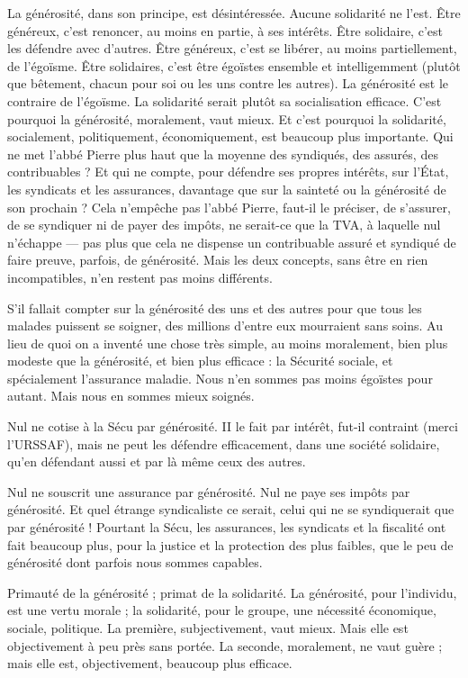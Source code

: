 La générosité, dans son principe, est désintéressée. Aucune solidarité ne
l'est. Être généreux, c’est renoncer, au moins en partie, à ses intérêts. Être solidaire,
c’est les défendre avec d’autres. Être généreux, c’est se libérer, au moins
partiellement, de l’égoïsme. Être solidaires, c’est être égoïstes ensemble et intelligemment
(plutôt que bêtement, chacun pour soi ou les uns contre les autres).
La générosité est le contraire de l’égoïsme. La solidarité serait plutôt sa socialisation
efficace. C’est pourquoi la générosité, moralement, vaut mieux. Et c’est
pourquoi la solidarité, socialement, politiquement, économiquement, est beaucoup
plus importante. Qui ne met l'abbé Pierre plus haut que la moyenne des
syndiqués, des assurés, des contribuables ? Et qui ne compte, pour défendre ses
propres intérêts, sur l’État, les syndicats et les assurances, davantage que sur la
sainteté ou la générosité de son prochain ? Cela n’empêche pas l’abbé Pierre,
faut-il le préciser, de s’assurer, de se syndiquer ni de payer des impôts, ne serait-ce
que la TVA, à laquelle nul n'échappe — pas plus que cela ne dispense un
contribuable assuré et syndiqué de faire preuve, parfois, de générosité. Mais
les deux concepts, sans être en rien incompatibles, n’en restent pas moins différents.

S’il fallait compter sur la générosité des uns et des autres pour que tous les
malades puissent se soigner, des millions d’entre eux mourraient sans soins. Au
lieu de quoi on a inventé une chose très simple, au moins moralement, bien
plus modeste que la générosité, et bien plus efficace : la Sécurité sociale, et spécialement
l'assurance maladie. Nous n’en sommes pas moins égoïstes pour
autant. Mais nous en sommes mieux soignés.

Nul ne cotise à la Sécu par générosité. II le fait par intérêt, fut-il contraint
(merci l'URSSAF), mais ne peut les défendre efficacement, dans une société
solidaire, qu’en défendant aussi et par là même ceux des autres.

Nul ne souscrit une assurance par générosité. Nul ne paye ses impôts par
générosité. Et quel étrange syndicaliste ce serait, celui qui ne se syndiquerait
que par générosité ! Pourtant la Sécu, les assurances, les syndicats et la fiscalité
ont fait beaucoup plus, pour la justice et la protection des plus faibles, que le
peu de générosité dont parfois nous sommes capables.

Primauté de la générosité ; primat de la solidarité. La générosité, pour
l'individu, est une vertu morale ; la solidarité, pour le groupe, une nécessité
économique, sociale, politique. La première, subjectivement, vaut mieux. Mais
elle est objectivement à peu près sans portée. La seconde, moralement, ne vaut
guère ; mais elle est, objectivement, beaucoup plus efficace.

